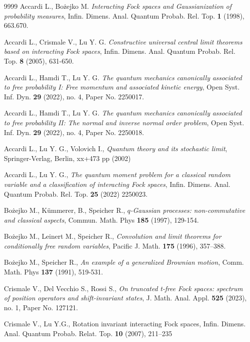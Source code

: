 \documentclass[12pt]{amsart}
\numberwithin{equation}{section}
\theoremstyle{definition}
\begin{document}
\begin{thebibliography}{9999}
 Accardi L., Bo\.{z}ejko M. \emph{Interacting Fock spaces and Gaussianization of probability measures}, Infin. Dimens. Anal. Quantum Probab. Rel. Top. \textbf{1} (1998), 663.670.

 Accardi L., Crismale V., Lu Y. G. \emph{Constructive universal central limit theorems based on interacting Fock spaces}, Infin. Dimens. Anal. Quantum Probab. Rel. Top. \textbf{8} (2005), 631-650.

 Accardi L., Hamdi T., Lu Y. G. \emph{The quantum mechanics canonically associated to free probability I: Free momentum and associated kinetic energy},  Open Syst. Inf. Dyn. \textbf{29} (2022), no. 4, Paper No. 2250017.

 Accardi L., Hamdi T., Lu Y. G. \emph{The quantum mechanics canonically associated to free probability II: The normal and inverse normal order problem},  Open Syst. Inf. Dyn. \textbf{29} (2022), no. 4, Paper No. 2250018.


 Accardi L., Lu Y. G., Volovich I., \emph{Quantum theory and its stochastic limit}, Springer-Verlag, Berlin, xx+473 pp (2002)

 Accardi L., Lu Y. G., \emph{The quantum moment problem for a classical random variable and a classification of interacting Fock spaces}, Infin. Dimens. Anal. Quantum Probab. Rel. Top. \textbf{25} (2022) 2250023.

 Bo\.{z}ejko M., Kümmerer, B., Speicher R., \emph{$q$-Gaussian processes: non-commutative and classical aspects}, Commun. Math. Phys \textbf{185} (1997), 129-154.

  Bo\.{z}ejko M., Leinert M., Speicher R., \emph{Convolution and limit theorems for conditionally free random variables},  Pacific J. Math. \textbf{175} (1996), 357–388.

 Bo\.{z}ejko M., Speicher R., \emph{An example of a generalized Brownian motion}, Comm. Math. Phys \textbf{137} (1991), 519-531.

 Crismale V., Del Vecchio S., Rossi S., {\it On truncated t-free Fock spaces: spectrum of position operators and shift-invariant states}, J. Math. Anal. Appl. \textbf {525} (2023), no. 1, Paper No. 127121.

 Crismale V., Lu Y.G., \emph{}{Rotation invariant interacting Fock spaces}, Infin. Dimens. Anal. Quantum Probab. Relat. Top. \textbf{10} (2007), 211–235


\end{thebibliography}
\end{document}
